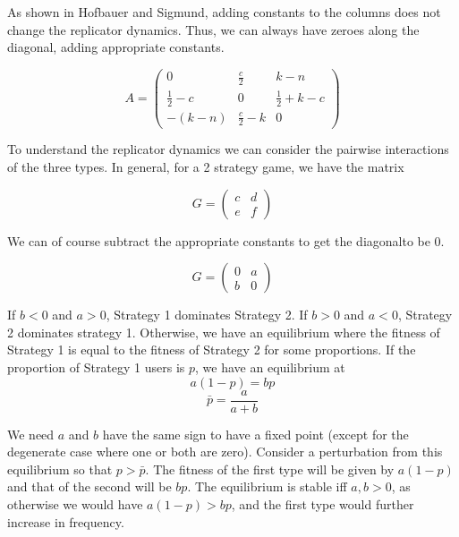 \documentclass[12pt]{report}
\begin{document}




As shown in Hofbauer and Sigmund, adding constants to the columns does not change the replicator dynamics. Thus, we can always have zeroes along the diagonal, adding appropriate constants. 

$$ A = \begin{pmatrix}
0 & \frac{c}{2} & k - n \\
\frac{1}{2} - c & 0 &\frac{1}{2} + k - c \\
- (k - n) & \frac{c}{2} - k & 0
\end{pmatrix} $$

To understand the replicator dynamics we can consider the pairwise interactions of the three types. In general, for a 2 strategy game, we have the matrix

$$G = \begin{pmatrix}
c & d \\
e & f 
\end{pmatrix}$$

We can of course subtract the appropriate constants to get the diagonalto be 0. 

$$G = \begin{pmatrix}
0 & a \\
b & 0 
\end{pmatrix} $$

If $b < 0$ and $a > 0$, Strategy 1 dominates Strategy 2. If $b > 0$ and $a < 0$, Strategy 2 dominates strategy 1. Otherwise, we have an equilibrium where the fitness of Strategy 1 is equal to the fitness of Strategy 2 for some proportions. If the proportion of Strategy 1 users is $p$, we have an equilibrium at 
$$ a (1 - p) = b p$$
$$\bar{p} = \frac{a}{a+b}$$

We need $a$ and $b$ have the same sign to have a fixed point (except for the degenerate case where one or both are zero). 
Consider a perturbation from this equilibrium so that $p > \bar{p}$. The fitness of the first type will be given by $a(1-p)$ and that of the second will be $bp$. The equilibrium is stable iff $a, b > 0$, as otherwise we would have $a(1-p) > bp$, and the first type would further increase in frequency.
\end{document}
